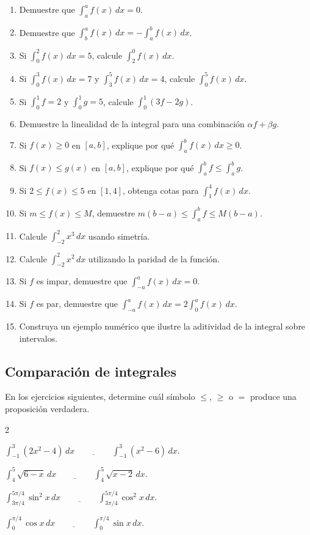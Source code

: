 \documentclass[12pt]{article}
\begin{document}
\begin{enumerate}[resume]
\item Demuestre que $\int_a^a f(x)\,dx=0$.
\item Demuestre que $\int_b^a f(x)\,dx=-\int_a^b f(x)\,dx$.
\item Si $\int_0^2f(x)\,dx=5$, calcule $\int_2^0f(x)\,dx$.
\item Si $\int_0^3f(x)\,dx=7$ y $\int_3^5f(x)\,dx=4$, calcule $\int_0^5f(x)\,dx$.
\item Si $\int_0^1f=2$ y $\int_0^1g=5$, calcule $\int_0^1(3f-2g)$.
\item Demuestre la linealidad de la integral para una combinación $\alpha f+\beta g$.
\item Si $f(x)\ge0$ en $[a,b]$, explique por qué $\int_a^bf(x)\,dx\ge0$.
\item Si $f(x)\le g(x)$ en $[a,b]$, explique por qué $\int_a^bf\le\int_a^bg$.
\item Si $2\le f(x)\le5$ en $[1,4]$, obtenga cotas para $\int_1^4f(x)\,dx$.
\item Si $m\le f(x)\le M$, demuestre $m(b-a)\le\int_a^bf\le M(b-a)$.
\item Calcule $\int_{-2}^{2}x^3\,dx$ usando simetría.
\item Calcule $\int_{-2}^{2}x^2\,dx$ utilizando la paridad de la función.
\item Si $f$ es impar, demuestre que $\int_{-a}^{a}f(x)\,dx=0$.
\item Si $f$ es par, demuestre que $\int_{-a}^{a}f(x)\,dx=2\int_0^af(x)\,dx$.
\item Construya un ejemplo numérico que ilustre la aditividad de la integral sobre intervalos.
\end{enumerate}

\subsection{Comparación de integrales}
En los ejercicios siguientes, determine cuál símbolo $\le$, $\ge$ o $=$
produce una proposición verdadera.

\begin{enumerate}
\begin{multicols}{2}
\item $\int_{-1}^{3}(2x^2-4)\,dx\quad\underline{\hspace{1cm}}\quad\int_{-1}^{3}(x^2-6)\,dx.$

\item $\int_4^5\sqrt{6-x}\,dx\quad\underline{\hspace{1cm}}\quad\int_4^5\sqrt{x-2}\,dx.$

\item $\int_{3\pi/4}^{5\pi/4}\sin^2x\,dx\quad\underline{\hspace{1cm}}\quad\int_{3\pi/4}^{5\pi/4}\cos^2x\,dx.$

\item $\int_0^{\pi/4}\cos x\,dx\quad\underline{\hspace{1cm}}\quad\int_0^{\pi/4}\sin x\,dx.$
\end{multicols}
\end{enumerate}
\end{document}
